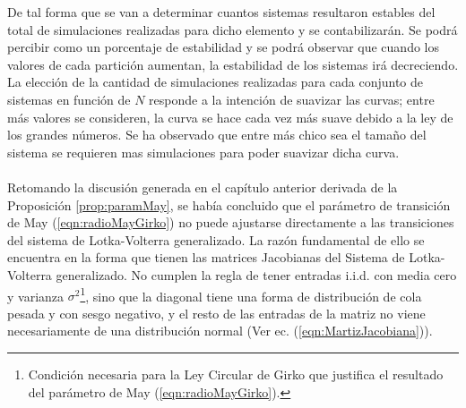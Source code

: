 De tal forma que se van a determinar cuantos sistemas resultaron estables del total de simulaciones realizadas para dicho elemento y se contabilizarán. Se podrá percibir como un porcentaje de estabilidad y se podrá observar que cuando los valores de cada partición aumentan, la estabilidad de los sistemas irá decreciendo. La elección de la cantidad de simulaciones realizadas para cada conjunto de sistemas en función de $N$ responde a la intención de suavizar las curvas; entre más valores se consideren, la curva se hace cada vez más suave debido a la ley de los grandes números. Se ha observado que entre más chico sea el tamaño del sistema se requieren mas simulaciones para poder suavizar dicha curva.\\
\\
Retomando la discusión generada en el capítulo anterior derivada de la Proposición \ref{prop:paramMay}, se había concluido que el parámetro de transición de May (\ref{eqn:radioMayGirko}) no puede ajustarse directamente a las transiciones del sistema de Lotka-Volterra generalizado. La razón fundamental de ello se encuentra en la forma que tienen las matrices Jacobianas del Sistema de Lotka-Volterra generalizado. No cumplen la regla de tener entradas i.i.d. con media cero y varianza $\sigma^2$\footnote{Condición necesaria para la Ley Circular de Girko que justifica el resultado del parámetro de May (\ref{eqn:radioMayGirko}).}, sino que la diagonal tiene una forma de distribución de cola pesada y con sesgo negativo, y el resto de las entradas de la matriz no viene necesariamente de una distribución normal (Ver ec. (\ref{eqn:MartizJacobiana})).
